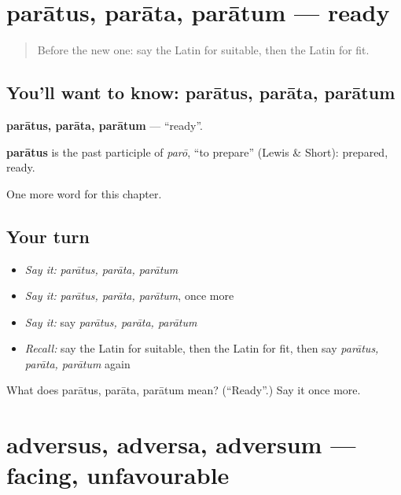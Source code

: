 \section[parātus, parāta, parātum]{parātus, parāta, parātum — ready}

\label{lesson:LA-C268-paratus}



\begin{quote}
Before the new one: say the Latin for suitable, then the Latin for fit.
\end{quote}

\subsection*{You'll want to know: parātus, parāta, parātum}
\textbf{parātus, parāta, parātum} — \textquotedblleft{}ready\textquotedblright{}.

\begin{cousinweb}
\textbf{parātus} is the past participle of \emph{parō}, \textquotedblleft{}to prepare\textquotedblright{} (Lewis \& Short): prepared, ready.
\end{cousinweb}

\begin{grammarlens}[title={What you've built}]
One more word for this chapter.
\end{grammarlens}

\subsection*{Your turn}
\begin{itemize}
\raggedright
  \item \emph{Say it:} \emph{parātus, parāta, parātum}
  \item \emph{Say it:} \emph{parātus, parāta, parātum}, once more
  \item \emph{Say it:} say \emph{parātus, parāta, parātum}
  \item \emph{Recall:} say the Latin for suitable, then the Latin for fit, then say \emph{parātus, parāta, parātum} again
\end{itemize}

\begin{tcolorbox}[breakable,colback=teal!4,colframe=teal!35!black,title={Before you move on}]
What does parātus, parāta, parātum mean? (\textquotedblleft{}Ready\textquotedblright{}.) Say it once more.
\end{tcolorbox}
\section[adversus, adversa, adversum]{adversus, adversa, adversum — facing, unfavourable}

